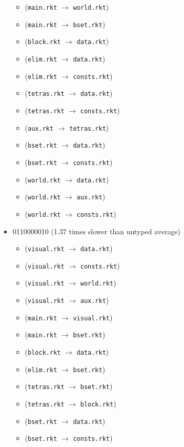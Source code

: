 \documentclass{article}
\newcommand{\mono}[1]{\texttt{#1}}
\begin{document}
\begin{itemize}
\begin{itemize}
  \item (\mono{main.rkt} $\rightarrow$ \mono{world.rkt})
  \item (\mono{main.rkt} $\rightarrow$ \mono{bset.rkt})
  \item (\mono{block.rkt} $\rightarrow$ \mono{data.rkt})
  \item (\mono{elim.rkt} $\rightarrow$ \mono{data.rkt})
  \item (\mono{elim.rkt} $\rightarrow$ \mono{consts.rkt})
  \item (\mono{tetras.rkt} $\rightarrow$ \mono{data.rkt})
  \item (\mono{tetras.rkt} $\rightarrow$ \mono{consts.rkt})
  \item (\mono{aux.rkt} $\rightarrow$ \mono{tetras.rkt})
  \item (\mono{bset.rkt} $\rightarrow$ \mono{data.rkt})
  \item (\mono{bset.rkt} $\rightarrow$ \mono{consts.rkt})
  \item (\mono{world.rkt} $\rightarrow$ \mono{data.rkt})
  \item (\mono{world.rkt} $\rightarrow$ \mono{aux.rkt})
  \item (\mono{world.rkt} $\rightarrow$ \mono{consts.rkt})
  \end{itemize}
\item 0110000010 (1.37 times slower than untyped average)
  \begin{itemize}
  \item (\mono{visual.rkt} $\rightarrow$ \mono{data.rkt})
  \item (\mono{visual.rkt} $\rightarrow$ \mono{consts.rkt})
  \item (\mono{visual.rkt} $\rightarrow$ \mono{world.rkt})
  \item (\mono{visual.rkt} $\rightarrow$ \mono{aux.rkt})
  \item (\mono{main.rkt} $\rightarrow$ \mono{visual.rkt})
  \item (\mono{main.rkt} $\rightarrow$ \mono{bset.rkt})
  \item (\mono{block.rkt} $\rightarrow$ \mono{data.rkt})
  \item (\mono{elim.rkt} $\rightarrow$ \mono{bset.rkt})
  \item (\mono{tetras.rkt} $\rightarrow$ \mono{bset.rkt})
  \item (\mono{tetras.rkt} $\rightarrow$ \mono{block.rkt})
  \item (\mono{bset.rkt} $\rightarrow$ \mono{data.rkt})
  \item (\mono{bset.rkt} $\rightarrow$ \mono{consts.rkt})

\end{itemize}
\end{itemize}
\end{document}
